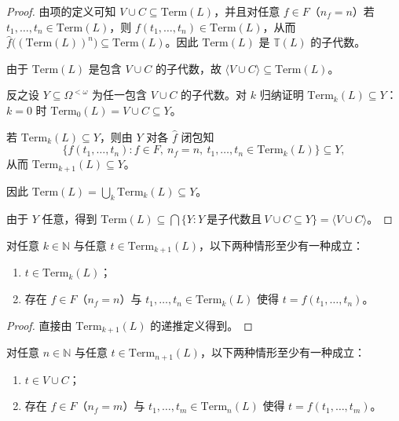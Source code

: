 \documentclass[lang=cn,a4paper,newtx,section]{elegantbook}
\begin{document}
\begin{proof}
由项的定义可知 $V\cup C\subseteq\mathrm{Term}(L)$，并且对任意 $f\in F$（$n_f=n$）若 $t_1,\dots,t_n\in\mathrm{Term}(L)$，则 $f(t_1,\dots,t_n)\in\mathrm{Term}(L)$，从而 $\widehat f\bigl((\mathrm{Term}(L))^{n}\bigr)\subseteq\mathrm{Term}(L)$。因此 $\mathrm{Term}(L)$ 是 $\mathbb T(L)$ 的子代数。

由于 $\mathrm{Term}(L)$ 是包含 $V\cup C$ 的子代数，故 $\langle V\cup C\rangle\subseteq\mathrm{Term}(L)$。

反之设 $Y\subseteq\Omega^{<\omega}$ 为任一包含 $V\cup C$ 的子代数。对 $k$ 归纳证明 $\mathrm{Term}_k(L)\subseteq Y$：
$k=0$ 时 $\mathrm{Term}_0(L)=V\cup C\subseteq Y$。

若 $\mathrm{Term}_k(L)\subseteq Y$，则由 $Y$ 对各 $\widehat f$ 闭包知
\[
  \{f(t_1,\dots,t_n): f\in F,\ n_f=n,\ t_1,\dots,t_n\in\mathrm{Term}_k(L)\}\subseteq Y,
\]
从而 $\mathrm{Term}_{k+1}(L)\subseteq Y$。

因此 $\mathrm{Term}(L)=\bigcup_k\mathrm{Term}_k(L)\subseteq Y$。

由于 $Y$ 任意，得到 $\mathrm{Term}(L)\subseteq\bigcap\{Y: Y\ \text{是子代数且}\ V\cup C\subseteq Y\}=\langle V\cup C\rangle$。
\end{proof}

 \begin{lemma}
 对任意 $k\in\mathbb N$ 与任意 $t\in\mathrm{Term}_{k+1}(L)$，以下两种情形至少有一种成立：
 \begin{enumerate}
   \item $t\in\mathrm{Term}_k(L)$；
   \item 存在 $f\in F$（$n_f=n$）与 $t_1,\dots,t_n\in\mathrm{Term}_k(L)$ 使得 $t=f(t_1,\dots,t_n)$。
 \end{enumerate}
 \end{lemma}
 
 \begin{proof}
 直接由 $\mathrm{Term}_{k+1}(L)$ 的递推定义得到。
 \end{proof}
 
 \begin{lemma}
 对任意 $n\in\mathbb N$ 与任意 $t\in\mathrm{Term}_{n+1}(L)$，以下两种情形至少有一种成立：
 \begin{enumerate}
   \item $t\in V\cup C$；
   \item 存在 $f\in F$（$n_f=m$）与 $t_1,\dots,t_m\in\mathrm{Term}_n(L)$ 使得 $t=f(t_1,\dots,t_m)$。
 \end{enumerate}
 \end{lemma}
 
\end{document}
